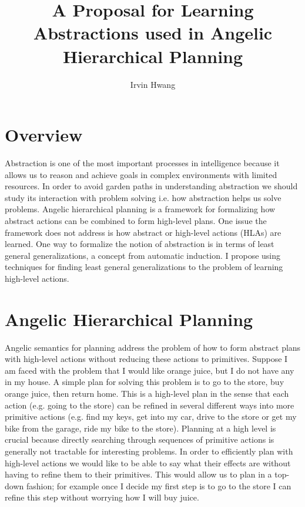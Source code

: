 \documentclass[a4paper,12pt]{article}
\begin{document}
\title{A Proposal for Learning Abstractions used in Angelic Hierarchical Planning}
\author{Irvin Hwang}
\maketitle

\section{Overview}
Abstraction is one of the most important processes in intelligence because it allows us to reason and achieve goals in complex environments with limited resources.  In order to avoid garden paths in understanding abstraction we should study its interaction with problem solving i.e. how abstraction helps us solve problems.  Angelic hierarchical planning is a framework for formalizing how abstract actions can be combined to form high-level plans.  One issue the framework does not address is how abstract or high-level actions (HLAs) are learned.  One way to formalize the notion of abstraction is in terms of least general generalizations, a concept from automatic induction.  I propose using techniques for finding least general generalizations to the problem of learning high-level actions.

\section{Angelic Hierarchical Planning}
Angelic semantics for planning address the problem of how to form abstract plans with high-level actions without reducing these actions to primitives.  Suppose I am faced with the problem that I would like orange juice, but I do not have any in my house.  A simple plan for solving this problem is to go to the store, buy orange juice, then return home.  This is a high-level plan in the sense that each action (e.g. going to the store) can be refined in several different ways into more primitive actions (e.g. find my keys, get into my car, drive to the store or get my bike from the garage, ride my bike to the store).  Planning at a high level is crucial because directly searching through sequences of primitive actions is generally not tractable for interesting problems.  In order to efficiently plan with high-level actions we would like to be able to say what their effects are without having to refine them to their primitives.  This would allow us to plan in a top-down fashion; for example once I decide my first step is to go to the store I can refine this step without worrying how I will buy juice.
\end{document}
